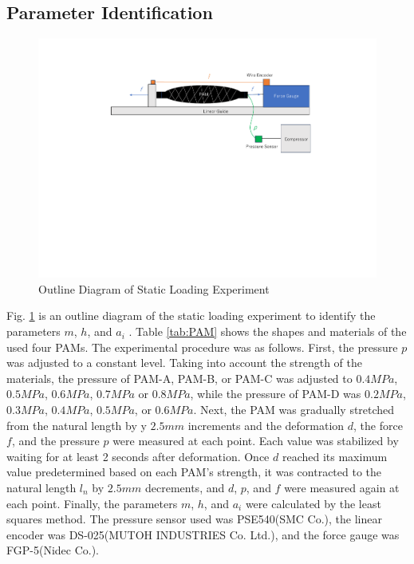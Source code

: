 \subsection{Parameter Identification}

\begin{figure}[h]
    \centering
    \includegraphics[width=\columnwidth]{fig/static_experiment.pdf}
    \caption{Outline Diagram of Static Loading Experiment}
    \label{fig:static_equipment}
 \end{figure}

Fig. \ref{fig:static_equipment} is an outline diagram of the static loading experiment to identify the parameters $m$, $h$, and $a_i$ .
Table \ref{tab:PAM} shows the shapes and materials of the used four PAMs.
The experimental procedure was as follows.
First, the pressure $p$ was adjusted to a constant level.
Taking into account the strength of the materials, the pressure of PAM-A, PAM-B, or PAM-C was adjusted to $0.4\si{MPa}$, $0.5\si{MPa}$, $0.6\si{MPa}$, $0.7\si{MPa}$ or $0.8\si{MPa}$, while the pressure of PAM-D was $0.2\si{MPa}$, $0.3\si{MPa}$, $0.4\si{MPa}$, $0.5\si{MPa}$, or $0.6\si{MPa}$.
Next, the PAM was gradually stretched from the natural length by y $2.5\si{mm}$ increments and the deformation $d$, the force $f$, and the pressure $p$ were measured at each point.
Each value was stabilized by waiting for at least 2 seconds after deformation.
Once $d$ reached its maximum value predetermined based on each PAM's strength, it was contracted to the natural length $l_n$ by  $2.5\si{mm}$ decrements, and $d$, $p$, and $f$ were measured again at each point.
Finally, the parameters $m$, $h$, and $a_i$ were calculated by the least squares method.
The pressure sensor used was PSE540(SMC Co.), the linear encoder was DS-025(MUTOH INDUSTRIES Co. Ltd.), and the force gauge was FGP-5(Nidec Co.).


